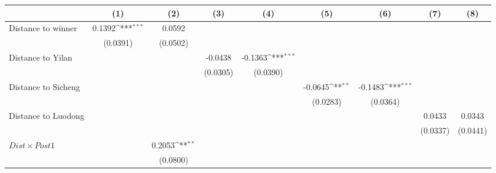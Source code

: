 {
\def\sym#1{\ifmmode^{#1}\else\(^{#1}\)\fi}
\begin{tabular}{l*{8}{c}}
\toprule
                &\multicolumn{1}{c}{(1)}         &\multicolumn{1}{c}{(2)}         &\multicolumn{1}{c}{(3)}         &\multicolumn{1}{c}{(4)}         &\multicolumn{1}{c}{(5)}         &\multicolumn{1}{c}{(6)}         &\multicolumn{1}{c}{(7)}         &\multicolumn{1}{c}{(8)}         \\
\midrule
Distance to winner&   0.1392\sym{***}&   0.0592         &                  &                  &                  &                  &                  &                  \\
                & (0.0391)         & (0.0502)         &                  &                  &                  &                  &                  &                  \\
\addlinespace
Distance to Yilan&                  &                  &  -0.0438         &  -0.1363\sym{***}&                  &                  &                  &                  \\
                &                  &                  & (0.0305)         & (0.0390)         &                  &                  &                  &                  \\
\addlinespace
Distance to Sicheng&                  &                  &                  &                  &  -0.0645\sym{**} &  -0.1483\sym{***}&                  &                  \\
                &                  &                  &                  &                  & (0.0283)         & (0.0364)         &                  &                  \\
\addlinespace
Distance to Luodong&                  &                  &                  &                  &                  &                  &   0.0433         &   0.0343         \\
                &                  &                  &                  &                  &                  &                  & (0.0337)         & (0.0441)         \\
\addlinespace
$ Dist \times Post1$&                  &   0.2053\sym{**} &                  &                  &                  &                  &                  &                  \\
                &                  & (0.0800)         &                  &                  &                  &                  &                  &                  \\

\end{tabular}}
